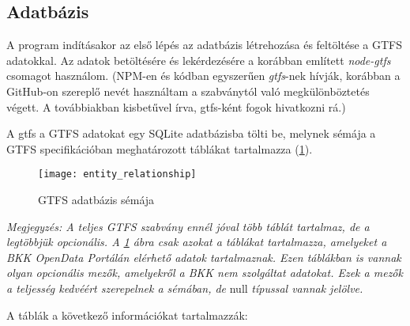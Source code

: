 \subsection{Adatbázis}

A program indításakor az első lépés az adatbázis létrehozása és feltöltése a GTFS adatokkal. Az adatok betöltésére és lekérdezésére a korábban említett \textit{node-gtfs} csomagot használom. (NPM-en és kódban egyszerűen \textit{gtfs}-nek hívják, korábban a GitHub-on szereplő nevét használtam a szabványtól való megkülönböztetés végett. A továbbiakban kisbetűvel írva, gtfs-ként fogok hivatkozni rá.)

A gtfs a GTFS adatokat egy SQLite adatbázisba tölti be, melynek sémája a GTFS specifikációban meghatározott táblákat tartalmazza (\ref{fig:gtfs-schema}). 

\pagebreak

\begin{figure}[H]
    \centering
    \texttt{[image: entity\_relationship]}
    \caption{GTFS adatbázis sémája}
    \label{fig:gtfs-schema}
\end{figure}

\pagebreak

\textit{Megjegyzés: A teljes GTFS szabvány ennél jóval több táblát tartalmaz, de a legtöbbjük opcionális. A \ref{fig:gtfs-schema} ábra csak azokat a táblákat tartalmazza, amelyeket a BKK OpenData Portálán elérhető adatok tartalmaznak. Ezen táblákban is vannak olyan opcionális mezők, amelyekről a BKK nem szolgáltat adatokat. Ezek a mezők a teljesség kedvéért szerepelnek a sémában, de} null \textit{típussal vannak jelölve.}

A táblák a következő információkat tartalmazzák\cite{gtfsspec}:

